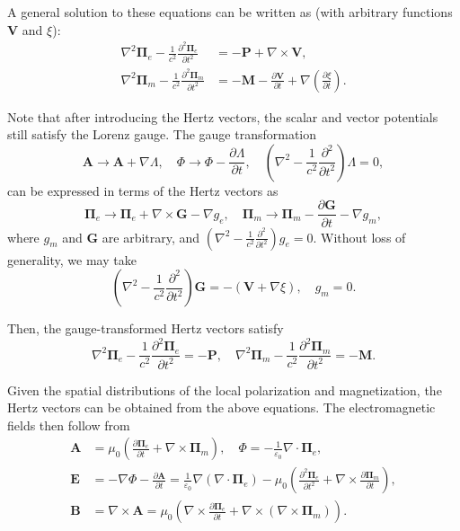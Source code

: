 \documentclass{article}
\begin{document}
	A general solution to these equations can be written as (with arbitrary functions $\bm{V}$ and $\xi$):
	\[
	\begin{split}
		\nabla^2 \bm{\Pi}_e - \frac{1}{c^2}\frac{\partial^2 \bm{\Pi}_e}{\partial t^2} &= -\bm{P} + \nabla \times \bm{V}, \\
		\nabla^2 \bm{\Pi}_m - \frac{1}{c^2}\frac{\partial^2 \bm{\Pi}_m}{\partial t^2} &= -\bm{M} - \frac{\partial \bm{V}}{\partial t} + \nabla \left( \frac{\partial \xi}{\partial t} \right).
	\end{split}
	\]
	
	Note that after introducing the Hertz vectors, the scalar and vector potentials still satisfy the Lorenz gauge. The gauge transformation
	\[
	\bm{A} \to \bm{A} + \nabla \Lambda, \quad 
	\Phi \to \Phi - \frac{\partial \Lambda}{\partial t}, \quad 
	\left( \nabla^2 - \frac{1}{c^2}\frac{\partial^2}{\partial t^2} \right) \Lambda = 0,
	\]
	can be expressed in terms of the Hertz vectors as
	\[
	\bm{\Pi}_e \to \bm{\Pi}_e + \nabla \times \bm{G} - \nabla g_e, \quad 
	\bm{\Pi}_m \to \bm{\Pi}_m - \frac{\partial \bm{G}}{\partial t} - \nabla g_m,
	\]
	where $g_m$ and $\bm{G}$ are arbitrary, and $\left( \nabla^2 - \frac{1}{c^2}\frac{\partial^2}{\partial t^2} \right) g_e = 0$.
	Without loss of generality, we may take
	\[
	\left( \nabla^2 - \frac{1}{c^2}\frac{\partial^2}{\partial t^2} \right) \bm{G} = -(\bm{V} + \nabla \xi), \quad g_m = 0.
	\]
	
	Then, the gauge-transformed Hertz vectors satisfy
	\[
	\nabla^2 \bm{\Pi}_e - \frac{1}{c^2}\frac{\partial^2 \bm{\Pi}_e}{\partial t^2} = -\bm{P}, \quad 
	\nabla^2 \bm{\Pi}_m - \frac{1}{c^2}\frac{\partial^2 \bm{\Pi}_m}{\partial t^2} = -\bm{M}.
	\]
	
	Given the spatial distributions of the local polarization and magnetization, the Hertz vectors can be obtained from the above equations. The electromagnetic fields then follow from
	\[
	\begin{split}
		\bm{A} &= \mu_0 \left( \frac{\partial \bm{\Pi}_e}{\partial t} + \nabla \times \bm{\Pi}_m \right), 
		\quad \Phi = -\frac{1}{\varepsilon_0} \nabla \cdot \bm{\Pi}_e, \\[6pt]
		\bm{E} &= -\nabla \Phi - \frac{\partial \bm{A}}{\partial t} 
		= \frac{1}{\varepsilon_0} \nabla (\nabla \cdot \bm{\Pi}_e)
		- \mu_0 \left( \frac{\partial^2 \bm{\Pi}_e}{\partial t^2} + \nabla \times \frac{\partial \bm{\Pi}_m}{\partial t} \right), \\[6pt]
		\bm{B} &= \nabla \times \bm{A} 
		= \mu_0 \left( \nabla \times \frac{\partial \bm{\Pi}_e}{\partial t} + \nabla \times (\nabla \times \bm{\Pi}_m) \right).
	\end{split}
	\]
	
\end{document}
